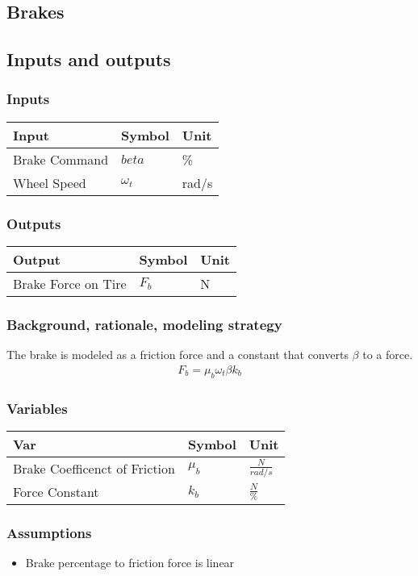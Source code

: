 \documentclass[../SimBALink.tex]{subfiles}
\begin{document}
\subsection{Brakes}

\subsection{Inputs and outputs}
	\subsubsection{Inputs}
	\begin{tabular}{ l | l | l  }
		Input					&	Symbol		&	Unit		\\	\hline
		Brake Command			& 	$beta$ 		&	\% \\
		Wheel Speed				&	$\omega_t$	&	rad/s
	\end{tabular}
	
	\subsubsection{Outputs}
	\begin{tabular}{ l | l | l  }
		Output					&	Symbol		&	Unit		\\	\hline
		Brake Force on Tire		&	$F_b$		&	N
	\end{tabular}

\subsubsection{Background, rationale, modeling strategy}
The brake is modeled as a friction force and a constant that converts $\beta$ to a force.
		\begin{gather}
			F_b = \mu_b \omega_t \beta k_b
		\end{gather}

\subsubsection{Variables}
	\begin{tabular}{ l | l | l  }
		Var									&	Symbol		&	Unit		\\	\hline
		Brake Coefficenct of Friction		&	$\mu_b$		&	 $\frac{N}{rad/s}$ \\
		Force Constant						&	$k_b$		&	 $\frac{N}{\%}$
	\end{tabular}

\subsubsection{Assumptions}
\begin{itemize}
  \item Brake percentage to friction force is linear
\end{itemize}
\end{document}
